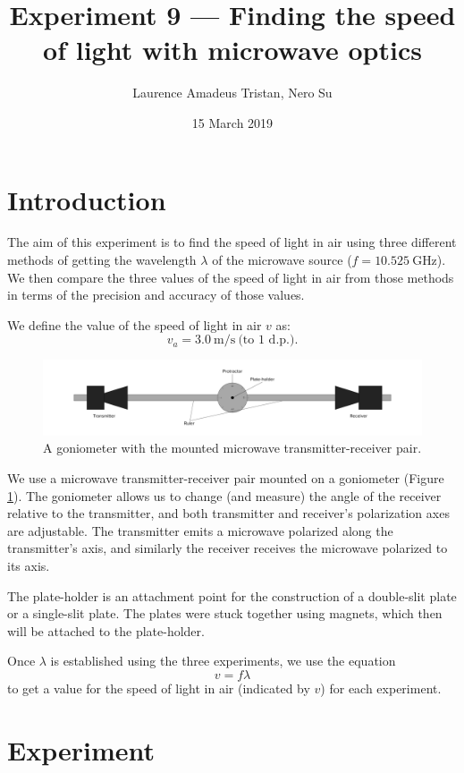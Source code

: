 \documentclass[letter,12pt]{article}
\title{Experiment 9 --- Finding the speed of light with microwave optics}
\author{Laurence Amadeus Tristan, Nero Su}
\date{15 March 2019}
\newcommand{\tlambda}{\(\lambda\) }
\numberwithin{equation}{section}
\numberwithin{figure}{section}
\numberwithin{table}{section}
\begin{document}
\maketitle

\section{Introduction}
The aim of this experiment is to find the speed of light in air using three different methods of getting the wavelength \tlambda of the microwave source (\(f = \SI{10.525}{\giga\hertz}\)). We then compare the three values of the speed of light in air from those methods in terms of the precision and accuracy of those values.

We define the value of the speed of light in air \(v\) as:
\[ v_a = \SI{3.0}{\metre\per\second} \ \text{(to 1 d.p.)}. \]

\begin{figure}[!ht]
  \centering
  \includegraphics[width=\textwidth]{goniometer.pdf}
  \caption{A goniometer with the mounted microwave transmitter-receiver pair.}
  \label{fig:i1}
\end{figure}

We use a microwave transmitter-receiver pair mounted on a goniometer (Figure \ref{fig:i1}). The goniometer allows us to change (and measure) the angle of the receiver relative to the transmitter, and both transmitter and receiver's polarization axes are adjustable. The transmitter emits a microwave polarized along the transmitter's axis, and similarly the receiver receives the microwave polarized to its axis.

The plate-holder is an attachment point for the construction of a double-slit plate or a single-slit plate. The plates were stuck together using magnets, which then will be attached to the plate-holder. \pagebreak[4]

Once \tlambda is established using the three experiments, we use the equation
\begin{equation}
  v = f \lambda
\end{equation}
to get a value for the speed of light in air (indicated by \(v\)) for each experiment.

\section{Experiment}
\end{document}
